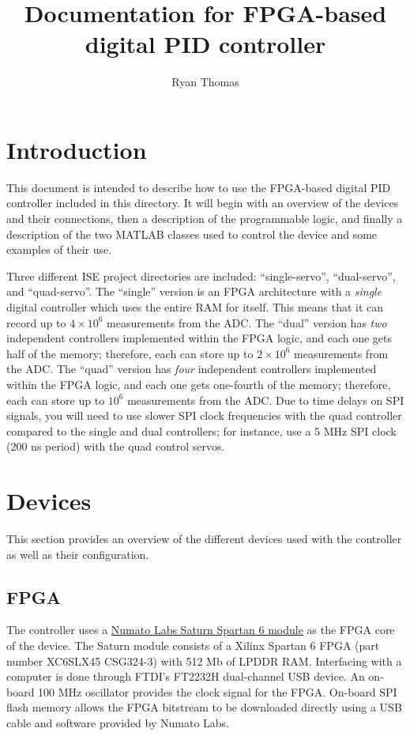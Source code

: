 \documentclass{article}
\begin{document}
\title{Documentation for FPGA-based digital PID controller}
\author{Ryan Thomas}

\maketitle

\section{Introduction}
This document is intended to describe how to use the FPGA-based digital PID controller included in this directory.  It will begin with an overview of the devices and their connections, then a description of the programmable logic, and finally a description of the two MATLAB classes used to control the device and some examples of their use.

Three different ISE project directories are included: ``single-servo'', ``dual-servo'', and ``quad-servo''.  The ``single'' version is an FPGA architecture with a \emph{single} digital controller which uses the entire RAM for itself.  This means that it can record up to $4\times 10^6$ measurements from the ADC.  The ``dual'' version has \emph{two} independent controllers implemented within the FPGA logic, and each one gets half of the memory; therefore, each can store up to $2\times 10^6$ measurements from the ADC.  The ``quad'' version has \emph{four} independent controllers implemented within the FPGA logic, and each one gets one-fourth of the memory; therefore, each can store up to $10^6$ measurements from the ADC.  Due to time delays on SPI signals, you will need to use slower SPI clock frequencies with the quad controller compared to the single and dual controllers; for instance, use a 5 MHz SPI clock (200 ns period) with the quad control servos.  

\section{Devices}
\label{sec:Devices}
This section provides an overview of the different devices used with the controller as well as their configuration.

\subsection{FPGA}
\label{ssec:FPGA}
The controller uses a \href{https://numato.com/product/saturn-spartan-6-fpga-development-board-with-ddr-sdram}{Numato Labs Saturn Spartan 6 module} as the FPGA core of the device.  The Saturn module consists of a Xilinx Spartan 6 FPGA (part number XC6SLX45 CSG324-3) with 512 Mb of LPDDR RAM.  Interfacing with a computer is done through FTDI’s FT2232H dual-channel USB device.  An on-board 100 MHz oscillator provides the clock signal for the FPGA.  On-board SPI flash memory allows the FPGA bitstream to be downloaded directly using a USB cable and software provided by Numato Labs.
\end{document}
